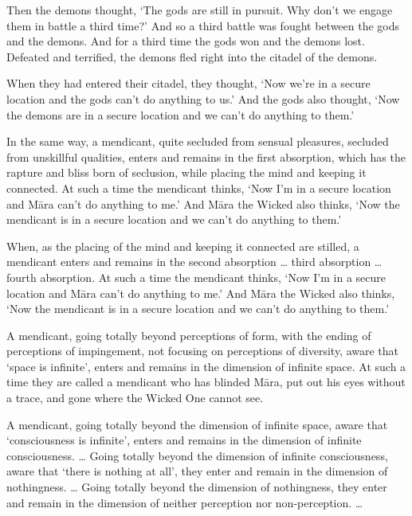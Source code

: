 \documentclass[12pt,openany]{book}%
\begin{document}
Then the demons thought, ‘The gods are still in pursuit. Why don’t we engage them in battle a third time?’ And so a third battle was fought between the gods and the demons. And for a third time the gods won and the demons lost. Defeated and terrified, the demons fled right into the citadel of the demons. 

When they had entered their citadel, they thought, ‘Now we’re in a secure location and the gods can’t do anything to us.’ And the gods also thought, ‘Now the demons are in a secure location and we can’t do anything to them.’ 

In the same way, a mendicant, quite secluded from sensual pleasures, secluded from unskillful qualities, enters and remains in the first absorption, which has the rapture and bliss born of seclusion, while placing the mind and keeping it connected. At such a time the mendicant thinks, ‘Now I’m in a secure location and \textsanskrit{Māra} can’t do anything to me.’ And \textsanskrit{Māra} the Wicked also thinks, ‘Now the mendicant is in a secure location and we can’t do anything to them.’ 

When, as the placing of the mind and keeping it connected are stilled, a mendicant enters and remains in the second absorption … third absorption … fourth absorption. At such a time the mendicant thinks, ‘Now I’m in a secure location and \textsanskrit{Māra} can’t do anything to me.’ And \textsanskrit{Māra} the Wicked also thinks, ‘Now the mendicant is in a secure location and we can’t do anything to them.’ 

A mendicant, going totally beyond perceptions of form, with the ending of perceptions of impingement, not focusing on perceptions of diversity, aware that ‘space is infinite’, enters and remains in the dimension of infinite space. At such a time they are called a mendicant who has blinded \textsanskrit{Māra}, put out his eyes without a trace, and gone where the Wicked One cannot see. 

A mendicant, going totally beyond the dimension of infinite space, aware that ‘consciousness is infinite’, enters and remains in the dimension of infinite consciousness. … Going totally beyond the dimension of infinite consciousness, aware that ‘there is nothing at all’, they enter and remain in the dimension of nothingness. … Going totally beyond the dimension of nothingness, they enter and remain in the dimension of neither perception nor non-perception. … 
\end{document}
